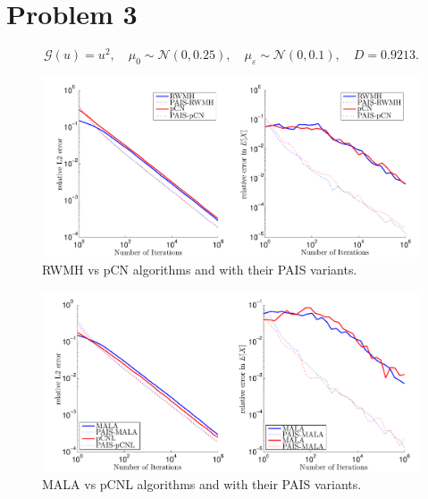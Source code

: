 \documentclass{article}
\begin{document}
\section{Problem 3}
\[
	\mathcal{G}(u) = u^2, \quad \mu_0 \sim \mathcal{N}(0, 0.25), \quad \mu_\varepsilon \sim \mathcal{N}(0, 0.1), \quad D = 0.9213.
\]
\begin{figure}[h]
\begin{center}
\includegraphics[width=\textwidth]{figures/RWMH3-pCN3}
\end{center}
\caption{RWMH vs pCN algorithms and with their PAIS variants.}
\label{fig:RWMH1}
\end{figure}
\begin{figure}[h]
\begin{center}
\includegraphics[width=\textwidth]{figures/MALA3-pCNL3}
\end{center}
\caption{MALA vs pCNL algorithms and with their PAIS variants.}
\label{fig:MALA1}
\end{figure}

\FloatBarrier\newpage
\end{document}
